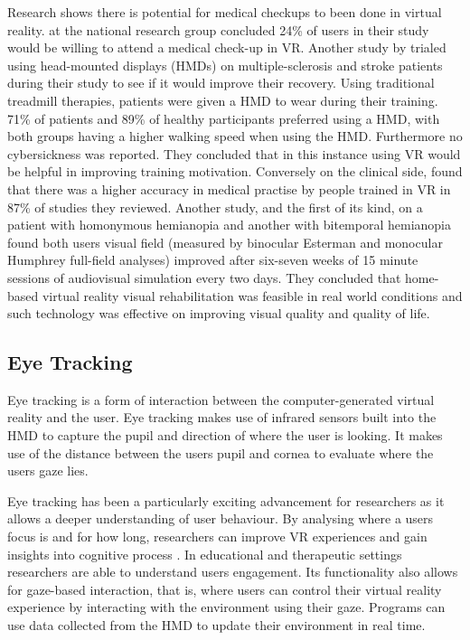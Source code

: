 \documentclass{l4proj}
\begin{document}
Research shows there is potential for medical checkups to been done in virtual reality. \citet{beyondreality2022} at the national research group concluded 24\% of users in their study would be willing to attend a medical check-up in VR. Another study by \citet{Winter2021} trialed using head-mounted displays (HMDs)  on multiple-sclerosis and stroke patients during their study to see if it would improve their recovery. Using traditional treadmill therapies, patients were given a HMD to wear during their training. 71\% of patients and 89\% of healthy participants preferred using a HMD, with both groups having a higher walking speed when using the HMD. Furthermore no cybersickness was reported. They concluded that in this instance using VR would be helpful in improving training motivation. Conversely on the clinical side, \citet{Samadbeik2018ApplicationsVR} found that there was a higher accuracy in medical practise by people trained in VR in 87\% of studies they reviewed. Another study, and the first of its kind, on a patient with homonymous hemianopia and another with bitemporal hemianopia found both users visual field (measured by binocular Esterman and monocular Humphrey full-field analyses) improved after six-seven weeks of 15 minute sessions of audiovisual simulation every two days. They concluded that home-based virtual reality visual rehabilitation was feasible in real world conditions and such technology was effective on improving visual quality and quality of life.

\subsection{Eye Tracking} \label{eye-tracking}
Eye tracking is a form of interaction between the computer-generated virtual reality and the user. Eye tracking makes use of infrared sensors built into the HMD to capture the pupil and direction of where the user is looking. It makes use of the distance between the users pupil and cornea to evaluate where the users gaze lies.

Eye tracking has been a particularly exciting advancement for researchers as it allows a deeper understanding of user behaviour. By analysing where a users focus is and for how long, researchers can improve VR experiences and gain insights into cognitive process \citep{Farnsworth2022VREyeTracking}. In educational and therapeutic settings researchers are able to understand users engagement. Its functionality also allows for gaze-based interaction, that is, where users can control their virtual reality experience by interacting with the environment using their gaze. Programs can use data collected from the HMD to update their environment in real time.
\end{document}
